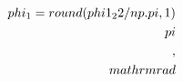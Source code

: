 \documentclass[preview]{standalone}
\begin{document}
\begin{align*}
\special{dvisvgm:raw <g id='unique000'>}\\phi_1 = {round(phi1_22/np.pi, 1)}\\pi\\,\\mathrm{{rad}}\special{dvisvgm:raw </g>}
\end{align*}
\end{document}
